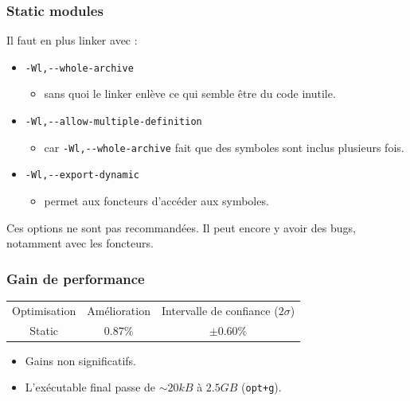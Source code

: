 \documentclass{beamer}
\begin{document}
\begin{frame}[fragile]
    \frametitle{Static modules}

    Il faut en plus linker avec :
    \begin{itemize}
        \item \verb'-Wl,--whole-archive'
              \begin{itemize}
                  \item sans quoi le linker enlève ce qui semble être du code inutile.
              \end{itemize}
        \item \verb'-Wl,--allow-multiple-definition'
              \begin{itemize}
                  \item car \verb'-Wl,--whole-archive' fait que des symboles sont inclus plusieurs fois.
              \end{itemize}
        \item \verb'-Wl,--export-dynamic'
              \begin{itemize}
                  \item permet aux foncteurs d'accéder aux symboles.
              \end{itemize}
    \end{itemize}

    Ces options ne sont pas recommandées.
    Il peut encore y avoir des bugs, notamment avec les foncteurs.
\end{frame}

\begin{frame}[fragile]
    \frametitle{Gain de performance}

    \begin{center}
        \begin{tabular}{ c c c }
            Optimisation & Amélioration & Intervalle de confiance ($2\sigma$) \\
            Static       & $0.87\%$     & $\pm 0.60\%$
        \end{tabular}
    \end{center}

    \begin{itemize}
        \item Gains non significatifs.
        \item L'exécutable final passe de $ \sim 20 kB $ à $ 2.5 GB $ (\verb'opt+g').
    \end{itemize}
\end{frame}
\end{document}

